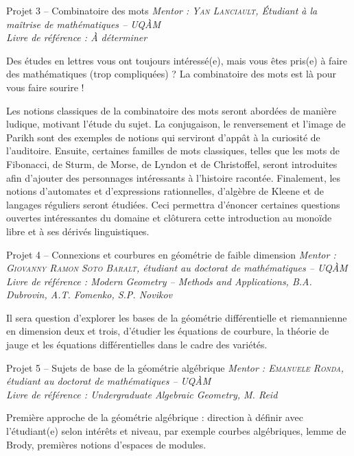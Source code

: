 \begin{projectbox}{Projet 3 -- Combinatoire des mots}
\textit{Mentor : \textsc{Yan Lanciault}, \'Etudiant à la maîtrise de mathématiques -- UQ\`AM}\\
\textit{Livre de référence : À déterminer}

\medskip
\noindent
Des études en lettres vous ont toujours intéressé(e), mais vous êtes pris(e) à faire des mathématiques (trop compliquées) ? La combinatoire des mots est là pour vous faire sourire !

\medskip
\noindent
Les notions classiques de la combinatoire des mots seront abordées de manière ludique, motivant l’étude du sujet. La conjugaison, le renversement et l’image de Parikh sont des exemples de notions qui serviront d’appât à la curiosité de l’auditoire. Ensuite, certaines familles de mots classiques, telles que les mots de Fibonacci, de Sturm, de Morse, de Lyndon et de Christoffel, seront introduites afin d’ajouter des personnages intéressants à l’histoire racontée. Finalement, les notions d’automates et d’expressions rationnelles, d’algèbre de Kleene et de langages réguliers seront étudiées. Ceci permettra d’énoncer certaines questions ouvertes intéressantes du domaine et clôturera cette introduction au monoïde libre et à ses dérivés linguistiques.
\end{projectbox}

\vspace{0.8em}

\begin{projectbox}{Projet 4 -- Connexions et courbures en géométrie de faible dimension}
\textit{Mentor : \textsc{Giovanny Ramon Soto Baralt}, étudiant au doctorat de mathématiques -- UQ\`AM}\\
\textit{Livre de référence : Modern Geometry -- Methods and Applications, B.A. Dubrovin, A.T. Fomenko, S.P. Novikov}

\medskip
\noindent Il sera question d'explorer les bases de la géométrie différentielle et riemannienne en dimension deux et trois, d'étudier les équations de courbure, la théorie de jauge et les équations différentielles dans le cadre des variétés.
\end{projectbox}

\vspace{0.8em}

\begin{projectbox}{Projet 5 -- Sujets de base de la géométrie algébrique}
\textit{Mentor : \textsc{Emanuele Ronda}, étudiant au doctorat de mathématiques -- UQ\`AM}\\
\textit{Livre de référence : Undergraduate Algebraic Geometry, M. Reid}

\medskip
\noindent Première approche de la géométrie algébrique : direction à définir avec l'étudiant(e) selon intér\^{e}ts et niveau, par exemple courbes algébriques, lemme de Brody, premières notions d'espaces de modules. 
\end{projectbox}

